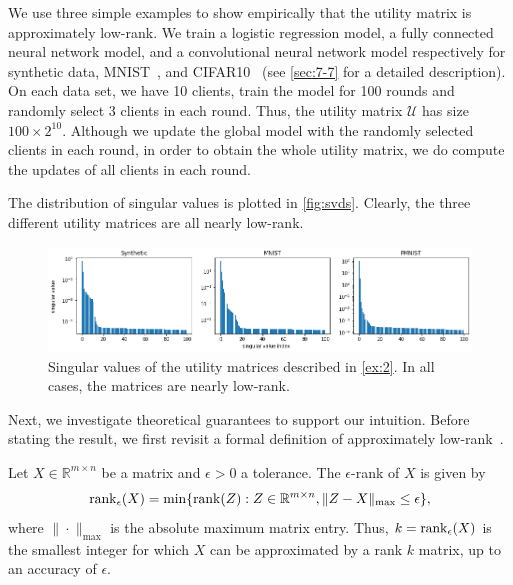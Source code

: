 \begin{example} \label{ex:2}
    We use three simple examples to show empirically that the utility matrix is approximately low-rank.  We train a logistic regression model, a fully connected neural network model, and a convolutional neural network model respectively for synthetic data, MNIST~\cite{lecun-mnisthandwrittendigit-2010}, and CIFAR10~\cite{Krizhevsky09learningmultiple} (see \autoref{sec:7-7} for a detailed description). On each data set, we have 10 clients, train the model for 100 rounds and randomly select 3 clients in each round. Thus, the utility matrix $\mathcal{U}$ has size $100\times 2^{10}$. Although we update the global model with the randomly selected clients in each round, in order to obtain the whole utility matrix, we do compute the updates of all clients in each round.
    
    The distribution of singular values is plotted in \autoref{fig:svds}. Clearly, the three different utility matrices are all nearly low-rank.

    \begin{figure}[t]
        \centering
        \includegraphics[width=\textwidth]{./figures/svds.png}
        \caption{Singular values of the utility matrices described in \autoref{ex:2}. In all cases, the matrices are nearly low-rank.}
        \label{fig:svds}
    \end{figure}

\end{example}

Next, we investigate theoretical guarantees to support our intuition. Before stating the result, we first revisit a formal definition of approximately low-rank~\cite{udell2019big}. 
\begin{definition} \label{def:epsilon-rank}
    Let $X\in\mathbb{R}^{m\times n}$ be a matrix and $\epsilon>0$ a tolerance. The $\epsilon$-rank of $X$ is given by 
    \[\operatorname{rank}_{\epsilon}(X) = \min\{\operatorname{rank}(Z): Z\in\mathbb{R}^{m\times n}, \|Z - X\|_{\max} \leq \epsilon\},\]
    where $\|\cdot\|_{\max}$ is the absolute maximum matrix entry. Thus, $k = \operatorname{rank}_{\epsilon} (X)$ is the smallest integer for which $X$ can be approximated by a rank $k$ matrix, up to an accuracy of $\epsilon$.
\end{definition}

